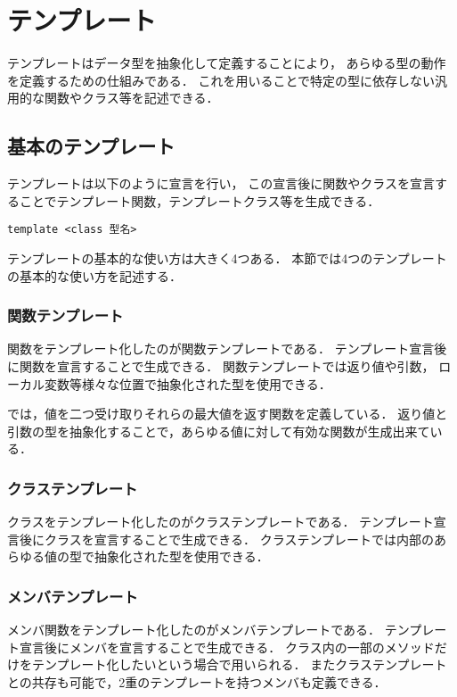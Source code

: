 \section{テンプレート}
テンプレートはデータ型を抽象化して定義することにより，
あらゆる型の動作を定義するための仕組みである．
これを用いることで特定の型に依存しない汎用的な関数やクラス等を記述できる．
\subsection{基本のテンプレート}
テンプレートは以下のように宣言を行い，
この宣言後に関数やクラスを宣言することでテンプレート関数，テンプレートクラス等を生成できる．
\begin{lstlisting}[]
template <class 型名>
\end{lstlisting}

テンプレートの基本的な使い方は大きく4つある．
本節では4つのテンプレートの基本的な使い方を記述する．

\subsubsection*{関数テンプレート}
関数をテンプレート化したのが関数テンプレートである．
テンプレート宣言後に関数を宣言することで生成できる．
関数テンプレートでは返り値や引数，
ローカル変数等様々な位置で抽象化された型を使用できる．

では，値を二つ受け取りそれらの最大値を返す関数を定義している．
返り値と引数の型を抽象化することで，あらゆる値に対して有効な関数が生成出来ている．


\subsubsection*{クラステンプレート}
クラスをテンプレート化したのがクラステンプレートである．
テンプレート宣言後にクラスを宣言することで生成できる．
クラステンプレートでは内部のあらゆる値の型で抽象化された型を使用できる．


\subsubsection*{メンバテンプレート}
メンバ関数をテンプレート化したのがメンバテンプレートである．
テンプレート宣言後にメンバを宣言することで生成できる．
クラス内の一部のメソッドだけをテンプレート化したいという場合で用いられる．
またクラステンプレートとの共存も可能で，2重のテンプレートを持つメンバも定義できる．

